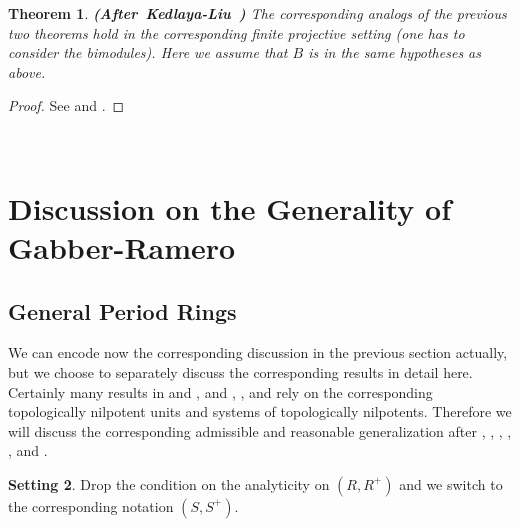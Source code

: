 \documentclass[12pt]{amsart}
\newtheorem{theorem}{Theorem}[section]
\theoremstyle{definition}
\numberwithin{equation}{section}
\newtheorem{setting}[theorem]{Setting}
\begin{document}
\begin{theorem}\mbox{\bf{(After Kedlaya-Liu \cite[Corollary 4.6.2]{KL2})}}
The corresponding analogs of the previous two theorems hold in the corresponding finite projective setting (one has to consider the bimodules). Here we assume that $B$ is in the same hypotheses as above.	
\end{theorem}

\begin{proof}
See \cite[Corollary 4.6.2]{KL2} and \cite[Proposition 5.12]{XT3}.	
\end{proof}




\

\section{Discussion on the Generality of Gabber-Ramero}


\subsection{General Period Rings}

\indent We can encode now the corresponding discussion in the previous section actually, but we choose to separately discuss the corresponding results in detail here. Certainly many results in \cite{KL1} and \cite{KL2}, and \cite{XT1}, \cite{XT2}, \cite{XT3} and \cite{XT4} rely on the corresponding topologically nilpotent units and systems of topologically nilpotents. Therefore we will discuss the corresponding admissible and reasonable generalization after \cite{KL1}, \cite{KL2}, \cite{XT1}, \cite{XT2}, \cite{XT3}, \cite{XT4} and \cite{GR}.




\begin{setting}
Drop the condition on the analyticity on $(R,R^+)$ and we switch to the corresponding notation $(S,S^+)$.	
\end{setting}

\end{document}
